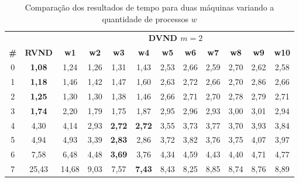 \begin{table}[htbp]
\caption{Comparação dos resultados de tempo para duas máquinas variando a quantidade de processos $w$}
\begin{center}
\begin{tabular}{cccccccccccc}
\hline
\hline
\multicolumn{2}{c}{} &\multicolumn{10}{c}{\textbf{DVND $m=2$}} \\
\cline{3-12}
\textbf{\#} & \textbf{RVND}& \textbf{w1}& \textbf{w2}& \textbf{w3}& \textbf{w4}& \textbf{w5}& \textbf{w6}& \textbf{w7}& \textbf{w8}& \textbf{w9}& \textbf{w10} \\
\hline
0 & \textbf{1,08}& 1,24&1,26&1,31&1,43&2,53&2,66&2,59&2,70&2,62&2,58 \\
1 & \textbf{1,18}& 1,46&1,42&1,47&1,60&2,63&2,72&2,66&2,70&2,86&2,66 \\
2 & \textbf{1,25}& 1,30&1,30&1,38&1,46&2,66&2,71&2,70&2,78&2,79&2,71 \\
3 & \textbf{1,74}& 2,20&1,79&1,75&1,87&2,95&2,96&2,93&3,00&3,01&2,94 \\
4 & 4,30& 4,14&2,93&\textbf{2,72}&\textbf{2,72}&3,55&3,73&3,77&3,70&3,93&3,84 \\
5 & 4,94& 4,93&3,39&\textbf{2,83}&2,86&3,72&3,82&3,76&3,75&4,07&3,97 \\
6 & 7,58& 6,48&4,48&\textbf{3,69}&3,76&4,34&4,59&4,43&4,40&4,71&4,77 \\
7 & 25,43&14,68&9,03&7,57&\textbf{7,43}&8,43&8,25&8,85&8,74&8,76&8,89 \\
\hline
\end{tabular}
\label{tab:rvndDvndN2times}
\end{center}
\end{table}

